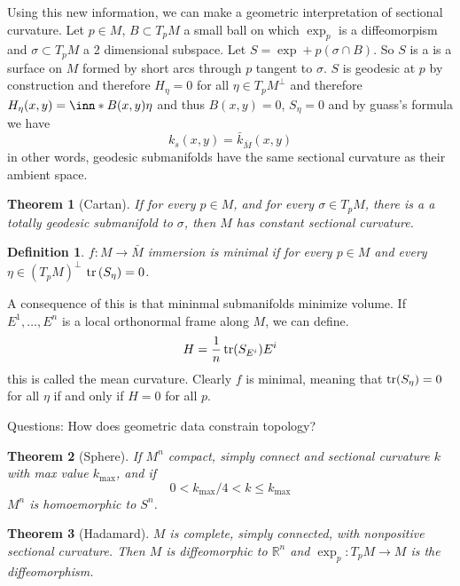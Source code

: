 \documentclass[a4paper]{article}
\newtheorem*{defn}{Definition}
\newtheorem*{thm}{Theorem}
\begin{document}
Using this new information, we can make a geometric interpretation of sectional curvature. Let $p \in M$, $B \subset T_pM$ a small ball on which $\exp_p$ is a diffeomorpism and $\sigma \subset T_pM$ a 2 dimensional subspace. Let $S = \exp+p(\sigma \cap B)$. So $S$ is a is a surface on $M$ formed by short arcs through $p$ tangent to $\sigma$. $S$ is geodesic at $p$ by construction and therefore $H_\eta = 0$ for all $\eta \in T_pM^\perp$ and therefore $H_\eta(x,y) = \inn*{B(x,y)}{\eta}$ and thus $B(x,y) = 0$, $S_\eta = 0$ and by guass's formula we have
\[
  k_s(x,y) = \bar{k}_{\bar{M}}(x,y)
\]
in other words, geodesic submanifolds have the same sectional curvature as their ambient space.
\begin{thm}[Cartan]
  If for every $p \in M$,  and for every $\sigma \in T_pM$, there is a a totally geodesic submanifold to $\sigma$, then $M$ has constant sectional curvature.
\end{thm}

\begin{defn}
  $f: M \rightarrow \bar{M}$ immersion is minimal if for every $p \in M$ and every $\eta \in (T_pM)^\perp$ $\tr \left( S_\eta \right)=0$.
\end{defn}

A consequence of this is that mininmal submanifolds minimize volume. If $E^1, \dots, E^n$ is a local orthonormal frame along $M$, we can define.
\[
  H = \frac{1}{n} \tr(S_{E^i})E^i
\]
this is called the mean curvature. Clearly $f$ is minimal, meaning that $\tr(S_\eta) = 0$ for all $\eta$ if and only if $H = 0$ for all $p$.

Questions: How does geometric data constrain topology?

\begin{thm}[Sphere]
  If $M^n$ compact, simply connect and sectional curvature $k$ with max value $k_{\max}$, and if
  \[
    0 < k_{\max}/4 < k \leq k_{\max}
  \]
  $M^n$ is homoemorphic to $S^n$.
\end{thm}

\begin{thm}[Hadamard]
  $M$ is complete, simply connected, with nonpositive sectional curvature. Then $M$ is diffeomorphic to $\mathds{R}^n$ and $\exp_p:T_pM \rightarrow M$ is the diffeomorphism.
\end{thm}
\end{document}
